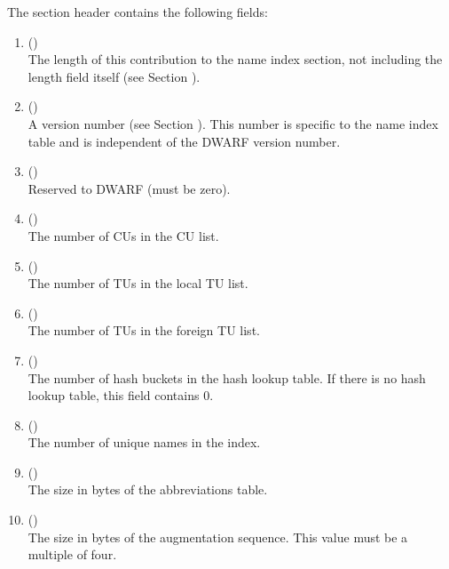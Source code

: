 \label{chap:sectionheader}
The section header contains the following fields:
\begin{enumerate}[1. ]

\item \HFNunitlength{} () \\
The length of this contribution to the name index section,
not including the length field itself
\bb
(see Section ).
\eb


\item \HFNversion{} (\HFTuhalf) \\
A version number 
(see Section ). 
This number is specific to the name index table and is
independent of the DWARF version number.

\item \HFNpadding{} (\HFTuhalf) \\
Reserved to DWARF (must be zero). 

\item \HFNcompunitcount{} (\HFTuword) \\
The number of CUs in the CU list.

\item \HFNlocaltypeunitcount{} (\HFTuword) \\
The number of TUs in the local TU list.

\item \HFNforeigntypeunitcount{} (\HFTuword) \\
The number of TUs in the foreign TU list.

\item \HFNbucketcount{} (\HFTuword) \\
The number of hash buckets in the hash lookup table. 
If there is no hash lookup table, this field contains 0.

\item \HFNnamecount{} (\HFTuword) \\
The number of unique names in the index.

\item \HFNabbrevtablesize{} (\HFTuword) \\
The size in bytes of the abbreviations table.

\item 
\bb
\HFNaugmentationsize{} (\HFTuword) \\
The size in bytes of the augmentation sequence. 
This value must be a multiple of four.
\eb


\end{enumerate}
